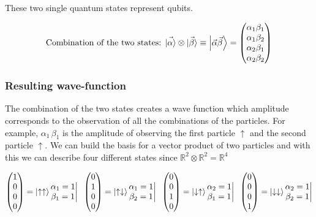 		These two single quantum states represent qubits.

		$$\text{Combination of the two states: }\vec{\ket{\alpha}}\otimes\vec{\ket{\beta}}\equiv{\ket{\vec{\alpha}\vec{\beta}}}=\begin{pmatrix}\alpha_1\beta_1\\\alpha_1\beta_2\\\alpha_2\beta_1\\\alpha_2\beta_2\end{pmatrix}$$

		\subsubsection{Resulting wave-function}
		The combination of the two states creates a wave function which amplitude corresponds to the observation of all the combinations of the particles.
		For example, $\alpha_1\,\beta_1$ is the amplitude of observing the first particle $\uparrow$ and the second particle $\uparrow$.
		We can build the basis for a vector product of two particles and with this we can describe four different states since $\mathbb{R}^2\otimes\mathbb{R}^2=\mathbb{R}^4$

		$$\begin{pmatrix}1\\0\\0\\0\end{pmatrix}=\ket{\uparrow\uparrow}\begin{matrix}\alpha_1=1\\\beta_1=1\end{matrix}\bigg| \;\;\begin{pmatrix}0\\1\\0\\0\end{pmatrix}=\ket{\uparrow\downarrow}\begin{matrix}\alpha_1=1\\\beta_2=1\end{matrix}\bigg| \;\;\begin{pmatrix}0\\0\\1\\0\end{pmatrix}=\ket{\downarrow\uparrow}\begin{matrix}\alpha_2=1\\\beta_1=1\end{matrix}\bigg| \;\;\begin{pmatrix}0\\0\\0\\1\end{pmatrix}=\ket{\downarrow\downarrow}\begin{matrix}\alpha_2=1\\\beta_2=1\end{matrix}\bigg|$$

